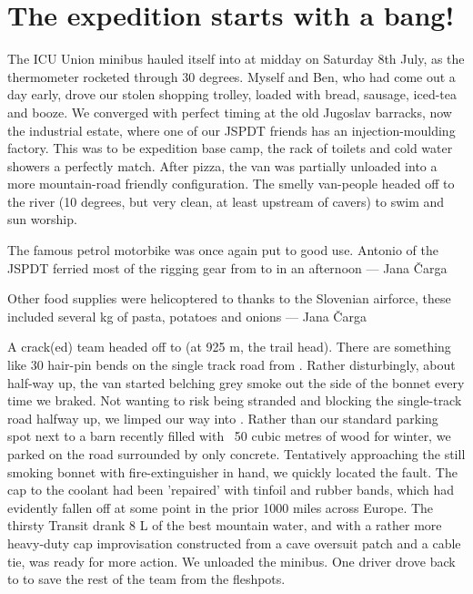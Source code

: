\section{The expedition starts with a bang!}
The ICU Union minibus hauled itself into  at midday on Saturday 8th July, as the thermometer rocketed through 30 degrees. Myself and Ben, who had come out a day early, drove our stolen shopping trolley, loaded with bread, sausage, iced-tea and booze. We converged with perfect timing at the old Jugoslav barracks, now the industrial estate, where one of our JSPDT friends has an injection-moulding factory. This was to be expedition base camp, the rack of toilets and cold water showers a perfectly match. After pizza, the van was partially unloaded into a more mountain-road friendly configuration. The smelly van-people headed off to the  river (10 degrees, but very clean, at least upstream of cavers) to swim and sun worship. 

\begin{marginfigure}
\checkoddpage \ifoddpage \forcerectofloat \else \forceversofloat \fi
\centering
{}
\caption{The famous petrol motorbike was once again put to good use. Antonio of the JSPDT ferried most of the rigging gear from \protect{} to \protect{} in an afternoon --- Jana \v{C}arga}
\label{lightning}
\end{marginfigure}

\begin{marginfigure}
\checkoddpage \ifoddpage \forcerectofloat \else \forceversofloat \fi
\centering
{}
\caption{Other food supplies were helicoptered to \protect{} thanks to the Slovenian airforce, these included several kg of pasta, potatoes and onions --- Jana \v{C}arga}
\label{lightning}
\end{marginfigure}

A crack(ed) team headed off to  (at 925 m, the trail head). There are something like 30 hair-pin bends on the single track road from . Rather disturbingly, about half-way up, the van started belching  grey smoke out the side of the bonnet every time we braked. Not wanting to risk being stranded and blocking the single-track road halfway up, we limped our way into . Rather than our standard parking spot next to a barn recently filled with ~50 cubic metres of wood for winter, we parked on the road surrounded by only concrete. Tentatively approaching the still smoking bonnet with fire-extinguisher in hand, we quickly located the fault. The cap to the coolant had been 'repaired' with tinfoil and rubber bands, which had evidently fallen off at some point in the prior 1000 miles across Europe. The thirsty Transit drank 8 L of the best mountain water, and with a rather more heavy-duty cap improvisation constructed from a cave oversuit patch and a cable tie, was ready for more action. We unloaded the minibus. One driver drove back to  to save the rest of the team from the fleshpots. 

